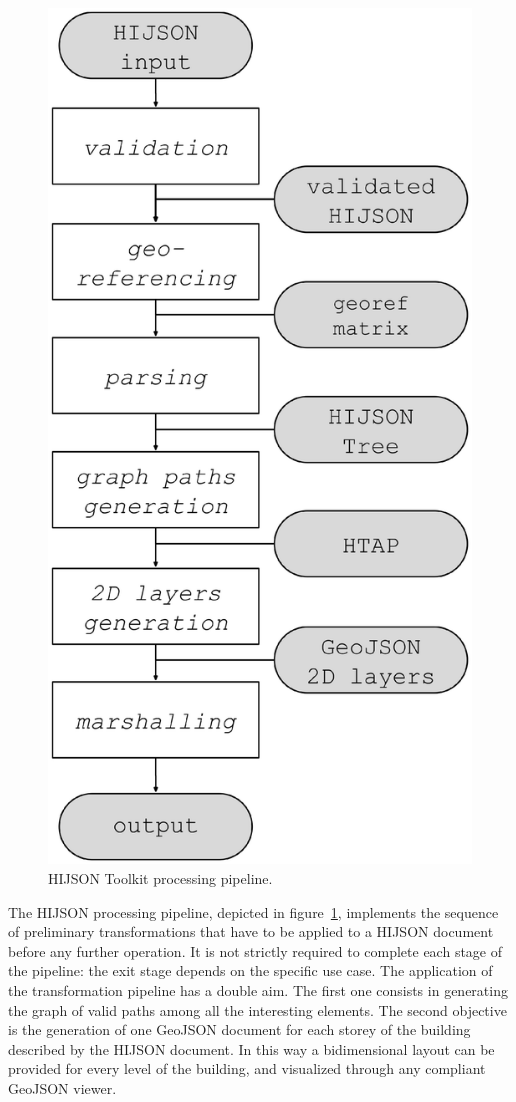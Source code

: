 \documentclass[]{egpubl}
\begin{document}
\begin{figure}[h]
 \centering
 \includegraphics[width=0.7\linewidth]{images/pipeline-horizontal}
 \caption{HIJSON Toolkit processing pipeline.}
 \label{fig:pipeline}
\end{figure}

The HIJSON processing pipeline, depicted in
figure~\ref{fig:pipeline}, implements the sequence of preliminary
transformations that have to be applied to a HIJSON document before any
further operation. It is not strictly required to complete each stage of the
pipeline: the exit stage depends on the specific use case.
The application of the transformation pipeline has a double aim. The first one
consists in generating the graph of valid paths among all the interesting
elements. The second objective is the generation of one GeoJSON document for
each storey of the building described by the HIJSON document. In this way a
bidimensional layout can be provided for every level of the building, and
visualized through any compliant GeoJSON viewer.
\end{document}
